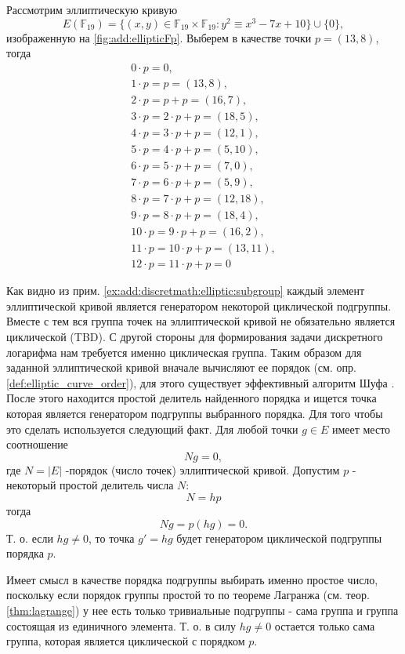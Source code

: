 \begin{example}
Рассмотрим эллиптическую кривую 
\[
E\left(\mathbb{F}_{19}\right) = 
\{(x,y) \in \mathbb{F}_{19} \times \mathbb{F}_{19}: y^2 \equiv x^3 -7 x +
10 \} \cup \{0\}, 
\] 
изображенную на \autoref{fig:add:ellipticFp}. Выберем
в качестве точки $p = (13, 8)$, тогда 
\begin{eqnarray}
0 \cdot p = 0, \nonumber \\
1 \cdot p = p = (13,8), \nonumber \\
2 \cdot p = p + p = (16,7), \nonumber \\
3 \cdot p = 2 \cdot p + p = (18,5), \nonumber \\
4 \cdot p = 3 \cdot p + p = (12,1), \nonumber \\
5 \cdot p = 4 \cdot p + p = (5,10), \nonumber \\
6 \cdot p = 5 \cdot p +p = (7,0), \nonumber \\
7 \cdot p = 6 \cdot p + p = (5,9), \nonumber \\
8 \cdot p = 7 \cdot p +p = (12,18), \nonumber \\
9 \cdot p = 8 \cdot p + p = (18,4), \nonumber \\
10 \cdot p = 9 \cdot p + p = (16,2), \nonumber \\
11 \cdot p = 10 \cdot p + p = (13,11), \nonumber \\
12 \cdot p = 11 \cdot p + p = 0
\nonumber 
\end{eqnarray}
\label{ex:add:discretmath:elliptic:subgroup}
\end{example}
Как видно из прим. \ref{ex:add:discretmath:elliptic:subgroup} каждый
элемент эллиптической кривой является генератором некоторой
циклической подгруппы. Вместе с тем вся группа точек на эллиптической
кривой не обязательно является циклической 
(TBD).
С другой стороны для формирования задачи дискретного логарифма нам
требуется именно циклическая группа. Таким образом для заданной
эллиптической кривой вначале вычисляют ее порядок (см.
опр. \ref{def:elliptic_curve_order}), для этого 
существует эффективный алгоритм Шуфа \cite{ReneSchoof:1985}. После
этого находится простой делитель найденного порядка и ищется точка
которая является генератором подгруппы выбранного порядка. Для того
чтобы это сделать используется следующий факт. Для любой точки 
$g \in E$ имеет место соотношение
\[
N g = 0,
\]
где $N = \left|E\right|$ -порядок (число точек) эллиптической кривой.
Допустим $p$ - некоторый простой делитель числа $N$:
\[
N = h p
\]
тогда
\[
N g = p \left( h g \right) = 0.
\]
Т. о. если $hg \ne 0$, то точка $g' = h g$ будет генератором
циклической подгруппы порядка $p$.
\begin{remark}
Имеет смысл в качестве порядка подгруппы выбирать именно простое
число, поскольку если порядок группы простой то по теореме Лагранжа
(см. теор. \ref{thm:lagrange})  у нее есть
только тривиальные подгруппы - сама группа и группа состоящая из
единичного элемента. Т. о. в силу $hg \ne 0$ остается только сама
группа, которая является циклической с порядком $p$. 
\end{remark}

